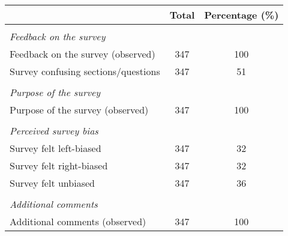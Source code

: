 \begin{tabular}{l*{1}{cc}}
\toprule
                &    Total&Percentage (\%)\\
\midrule
\vspace{0.1em} \\ \emph{Feedback on the survey}&         &         \\
Feedback on the survey (observed)&      347&      100\\
Survey confusing sections/questions&      347&       51\\
\vspace{0.1em} \\ \emph{Purpose of the survey}&         &         \\
Purpose of the survey (observed)&      347&      100\\
\vspace{0.1em} \\ \emph{Perceived survey bias}&         &         \\
Survey felt left-biased&      347&       32\\
Survey felt right-biased&      347&       32\\
Survey felt unbiased&      347&       36\\
\vspace{0.1em} \\ \emph{Additional comments}&         &         \\
Additional comments (observed)&      347&      100\\
\bottomrule
\end{tabular}
